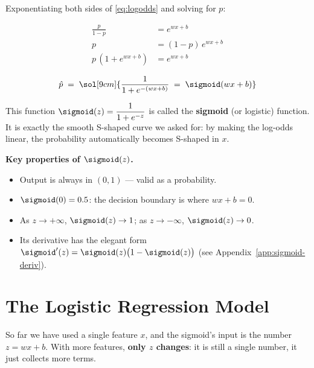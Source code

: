 \documentclass[12pt, a4paper]{article}
\begin{document}
Exponentiating both sides of \eqref{eq:logodds} and solving for $p$:

\begin{align*}
  \frac{p}{1-p}     & = e^{wx+b}        \\[4pt]
  p                 & = (1-p)\,e^{wx+b} \\[4pt]
  p\,(1 + e^{wx+b}) & = e^{wx+b}
\end{align*}

\begin{resultbox}
  \[
    \hat{p} \;=\; \sol[9cm]{\frac{1}{1 + e^{-(wx+b)}} \;=\; \sigmoid(wx+b)}
  \]
\end{resultbox}

This function $\sigmoid(z) = \dfrac{1}{1+e^{-z}}$ is called the
\textbf{sigmoid} (or logistic) function.
It is exactly the smooth S-shaped curve we asked for: by making the
log-odds linear, the probability automatically becomes S-shaped in $x$.

\begin{notebox}
  \textbf{Key properties of $\sigmoid(z)$.}
  \begin{itemize}[nosep]
    \item Output is always in $(0, 1)$ — valid as a probability.
    \item $\sigmoid(0) = 0.5$: the decision boundary is where $wx + b = 0$.
    \item As $z \to +\infty$, $\sigmoid(z) \to 1$; as $z \to -\infty$,
          $\sigmoid(z) \to 0$.
    \item Its derivative has the elegant form
          $\sigmoid'(z) = \sigmoid(z)\bigl(1 - \sigmoid(z)\bigr)$
          (see Appendix~\ref{app:sigmoid-deriv}).
  \end{itemize}
\end{notebox}


\section{The Logistic Regression Model}

So far we have used a single feature $x$, and the sigmoid's input is the
number $z = wx + b$.
With more features, \textbf{only $z$ changes}: it is still a single number,
it just collects more terms.
\end{document}
